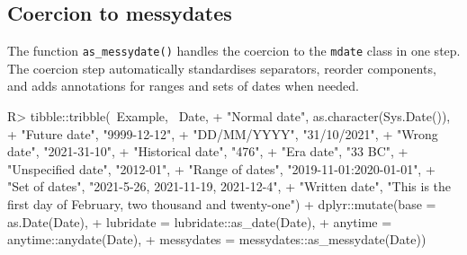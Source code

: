 \documentclass[
]{jss}
\begin{document}
\hypertarget{coercion-to-messydates}{%
\subsection{Coercion to messydates}\label{coercion-to-messydates}}

The function \texttt{as\_messydate()} handles the coercion to the
\texttt{mdate} class in one step. The coercion step automatically
standardises separators, reorder components, and adds annotations for
ranges and sets of dates when needed.

\begin{CodeChunk}
\begin{CodeInput}
R> tibble::tribble(~Example, ~Date,
+                 "Normal date", as.character(Sys.Date()),
+                 "Future date", "9999-12-12",
+                 "DD/MM/YYYY", "31/10/2021",
+                 "Wrong date", "2021-31-10",
+                 "Historical date", "476",
+                 "Era date", "33 BC",
+                 "Unspecified date", "2012-01",
+                 "Range of dates", "2019-11-01:2020-01-01",
+                 "Set of dates", "2021-5-26, 2021-11-19, 2021-12-4",
+                 "Written date", "This is the first day of February, two thousand and twenty-one") %
+   dplyr::mutate(base = as.Date(Date),
+                 lubridate = lubridate::as_date(Date),
+                 anytime = anytime::anydate(Date),
+                 messydates = messydates::as_messydate(Date))
\end{CodeInput}
\begin{CodeOutput}
# A tibble: 10 x 6
   Example          Date                base       lubridate  anytime    messy~1
   <chr>            <chr>               <date>     <date>     <date>     <mdate>
 1 Normal date      2022-11-10          2022-11-10 2022-11-10 2022-11-10 2022-1~
 2 Future date      9999-12-12          9999-12-12 9999-12-12 9999-12-12 9999-1~
 3 DD/MM/YYYY       31/10/2021          NA         NA         NA         2021-1~
 4 Wrong date       2021-31-10          NA         NA         NA         2021-3~
 5 Historical date  476                 NA         NA         NA         0476  ~
 6 Era date         33 BC               NA         NA         NA         -0033 ~
 7 Unspecified date 2012-01             NA         2020-12-01 2012-01-01 2012-0~
 8 Range of dates   2019-11-01:2020-01~ 2019-11-01 2019-11-01 2019-11-01 2019-1~
 9 Set of dates     2021-5-26, 2021-11~ 2021-05-26 NA         2021-05-26 {2021-~
10 Written date     This is the first ~ NA         NA         NA         2021-0~
# ... with abbreviated variable name 1: messydates
\end{CodeOutput}
\end{CodeChunk}
\end{document}
